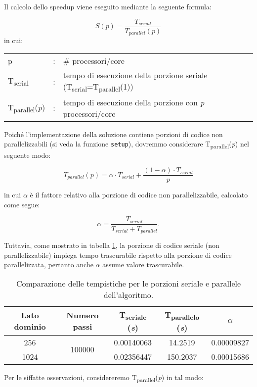 Il calcolo dello speedup viene eseguito mediante la seguente formula:

\[
    S(p) = \frac{T_{serial}}{T_{parallel}(p)}
\]
in cui:
\begin{table}[ht]
\begin{tabular}{lll}
    p & : & \# processori/core\\
    T\textsubscript{serial}& : & tempo di esecuzione della porzione seriale
    (T\textsubscript{serial}=T\textsubscript{parallel}(1))\\
    T\textsubscript{parallel}(\textit{p}) & : & tempo di esecuzione della porzione con
    \textit{p} processori/core
\end{tabular}
\end{table}

Poiché l'implementazione della soluzione contiene porzioni di codice non
parallelizzabili (si veda la funzione \texttt{setup}), dovremmo considerare
T\textsubscript{parallel}(\textit{p}) nel seguente modo:

\[ 
T_{parallel}(p) = \alpha \cdot T_{serial} +  \frac{(1 - \alpha) \cdot
T_{serial}}{p}
\]

in cui $\alpha$ è il fattore relativo alla porzione di codice non
parallelizzabile, calcolato come segue:

\[ 
\alpha = \frac{T_{serial}}{T_{serial} + T_{parallel}}.
\]

Tuttavia, come mostrato in tabella \ref{tab:alpha}, la porzione di codice
seriale (non parallelizzabile) impiega tempo trascurabile rispetto alla porzione
di codice parallelizzata, pertanto anche $\alpha$ assume valore trascurabile.

\begin{table}[ht]
\centering
\begin{tabular}{ccccc}
\toprule
 Lato dominio & Numero passi & T\textsubscript{seriale} (\textit{s}) &
 T\textsubscript{parallelo} (\textit{s})& $\alpha$ \\
 \midrule
    256 & \multirow{2}{*}{100000} & 0.00140063 & 14.2519 & 0.00009827 \\
    1024 & & 0.02356447 & 150.2037 & 0.00015686 \\
\bottomrule
\end{tabular}
\caption{Comparazione delle tempistiche per le porzioni seriale e parallele
dell'algoritmo.\label{tab:alpha}}
\end{table}

Per le siffatte osservazioni, considereremo
T\textsubscript{parallel}(\textit{p}) in tal modo:

